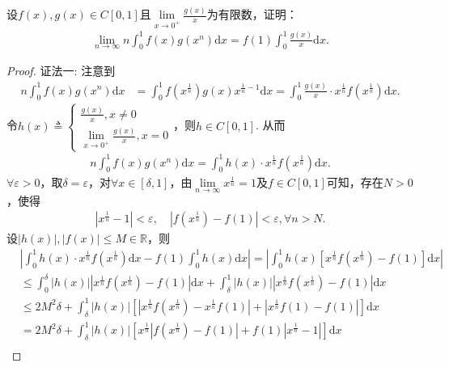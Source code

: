 \documentclass[../../main.tex]{subfiles}%
\begin{document}
\begin{example}
设$f(x),g(x)\in C[0,1]$且$\lim\limits_{x\rightarrow 0^+}\frac{g(x)}{x}$为有限数，证明：
\begin{align*}
\lim\limits_{n\rightarrow \infty}n\int_0^1 f(x)g(x^n)\mathrm{d}x=f(1)\int_0^1 \frac{g(x)}{x}\mathrm{d}x.
\end{align*}
\end{example}
\begin{proof}

{\color{blue}证法一:}
注意到
\begin{align*}
n\int_0^1 f(x)g(x^n)\mathrm{d}x&=\int_0^1 f\left(x^{\frac{1}{n}}\right)g(x)x^{\frac{1}{n}-1}\mathrm{d}x=\int_0^1 \frac{g(x)}{x}\cdot x^{\frac{1}{n}}f\left(x^{\frac{1}{n}}\right)\mathrm{d}x.
\end{align*}
令$h(x)\triangleq \begin{cases}
\frac{g(x)}{x},x\ne 0\\
\lim\limits_{x\rightarrow 0^+}\frac{g(x)}{x},x=0
\end{cases}$，则$h\in C[0,1]$. 从而
\begin{align*}
n\int_0^1 f(x)g(x^n)\mathrm{d}x=\int_0^1 h(x)\cdot x^{\frac{1}{n}}f\left(x^{\frac{1}{n}}\right)\mathrm{d}x.
\end{align*}
$\forall \varepsilon >0$，取$\delta =\varepsilon$，对$\forall x\in [\delta,1]$，由$\lim\limits_{n\rightarrow \infty}x^{\frac{1}{n}}=1$及$f\in C[0,1]$可知，存在$N>0$，使得
\begin{align*}
\left|x^{\frac{1}{n}}-1\right|<\varepsilon,\quad \left|f\left(x^{\frac{1}{n}}\right)-f(1)\right|<\varepsilon,\forall n>N.
\end{align*}
设$\left|h(x)\right|,\left|f(x)\right|\leqslant M\in \mathbb{R}$，则
\begin{align*}
&\left|\int_0^1 h(x)\cdot x^{\frac{1}{n}}f\left(x^{\frac{1}{n}}\right)\mathrm{d}x-f(1)\int_0^1 h(x)\mathrm{d}x\right|=\left|\int_0^1 h(x)\left[x^{\frac{1}{n}}f\left(x^{\frac{1}{n}}\right)-f(1)\right]\mathrm{d}x\right|\\
&\leqslant \int_0^{\delta}\left|h(x)\right|\left|x^{\frac{1}{n}}f\left(x^{\frac{1}{n}}\right)-f(1)\right|\mathrm{d}x+\int_{\delta}^1\left|h(x)\right|\left|x^{\frac{1}{n}}f\left(x^{\frac{1}{n}}\right)-f(1)\right|\mathrm{d}x\\
&\leqslant 2M^2\delta+\int_{\delta}^1\left|h(x)\right|\left[\left|x^{\frac{1}{n}}f\left(x^{\frac{1}{n}}\right)-x^{\frac{1}{n}}f(1)\right|+\left|x^{\frac{1}{n}}f(1)-f(1)\right|\right]\mathrm{d}x\\
&=2M^2\delta+\int_{\delta}^1\left|h(x)\right|\left[x^{\frac{1}{n}}\left|f\left(x^{\frac{1}{n}}\right)-f(1)\right|+f(1)\left|x^{\frac{1}{n}}-1\right|\right]\mathrm{d}x\\

\end{align*}
\end{proof}
\end{document}
